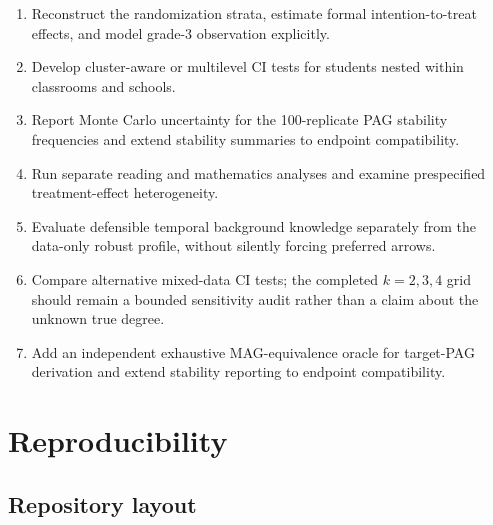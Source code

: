 \documentclass[11pt,a4paper,oneside]{report}
\begin{document}
\begin{enumerate}[leftmargin=2em,itemsep=0.25em,parsep=0pt,topsep=0.3em]
  \item Reconstruct the randomization strata, estimate formal intention-to-treat
        effects, and model grade-3 observation explicitly.
  \item Develop cluster-aware or multilevel CI tests for students nested within
        classrooms and schools.
  \item Report Monte Carlo uncertainty for the 100-replicate PAG stability
        frequencies and extend stability summaries to endpoint compatibility.
  \item Run separate reading and mathematics analyses and examine prespecified
        treatment-effect heterogeneity.
  \item Evaluate defensible temporal background knowledge separately from the
        data-only robust profile, without silently forcing preferred arrows.
  \item Compare alternative mixed-data CI tests; the completed \(k=2,3,4\)
        grid should remain a bounded sensitivity audit rather than a claim
        about the unknown true degree.
  \item Add an independent exhaustive MAG-equivalence oracle for target-PAG
        derivation and extend stability reporting to endpoint compatibility.
\end{enumerate}

\appendix

\chapter{Reproducibility}

\section{Repository layout}
\end{document}
